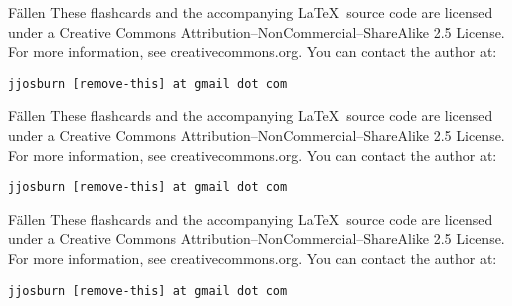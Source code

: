 \documentclass[avery5371,frame,grid]{flashcards}
\begin{document}
\begin{flashcard}[Verb]{\Huge Fällen}
{\large These flashcards and the accompanying \LaTeX \, source code are licensed
under a Creative Commons Attribution--NonCommercial--ShareAlike 2.5 License.  
For more information, see creativecommons.org.  You can contact the author at: }
\begin{center}
\begin{small}\tt jjosburn [remove-this] at gmail dot com\end{small}
\end{center}
\end{flashcard}

\begin{flashcard}[Verb]{\Huge Fällen}
{\large These flashcards and the accompanying \LaTeX \, source code are licensed
under a Creative Commons Attribution--NonCommercial--ShareAlike 2.5 License.  
For more information, see creativecommons.org.  You can contact the author at: }
\begin{center}
\begin{small}\tt jjosburn [remove-this] at gmail dot com\end{small}
\end{center}
\end{flashcard}

\begin{flashcard}[Verb]{\Huge Fällen}
{\large These flashcards and the accompanying \LaTeX \, source code are licensed
under a Creative Commons Attribution--NonCommercial--ShareAlike 2.5 License.  
For more information, see creativecommons.org.  You can contact the author at: }
\begin{center}
\begin{small}\tt jjosburn [remove-this] at gmail dot com\end{small}
\end{center}
\end{flashcard}
\end{document}
